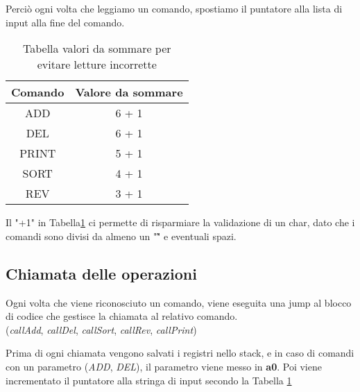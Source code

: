 Perciò ogni volta che leggiamo un comando,
 spostiamo il puntatore alla lista di input alla fine del comando. \\
\begin{table}[H]
\begin{center}
\begin{tabular}{|c|c|}
    \hline
    Comando & Valore da sommare \\
    \hline 
    ADD & 6 + 1 \\
    \hline
    DEL & 6 + 1 \\
    \hline
    PRINT & 5 + 1 \\
    \hline
    SORT & 4 + 1 \\
    \hline
    REV & 3 + 1 \\
    \hline
\end{tabular}
\caption{Tabella valori da sommare per evitare 
letture incorrette}
\label{tab:valoriDaSommare}
\end{center}
\end{table}

Il "+1" in Tabella\ref{tab:valoriDaSommare} ci 
permette di risparmiare la validazione di un char,
 dato che i comandi sono divisi da almeno un "\~" 
 e eventuali spazi.

\subsection{Chiamata delle operazioni}
Ogni volta che viene riconosciuto un comando, viene eseguita una jump al blocco di codice che gestisce la
chiamata al relativo comando.\\
(\textit{callAdd}, \textit{callDel}, \textit{callSort}, \textit{callRev}, \textit{callPrint})

Prima di ogni chiamata vengono salvati i registri nello stack, e in caso di comandi
con un parametro (\textit{ADD}, \textit{DEL}), il parametro viene messo in \textbf{a0}.
Poi viene incrementato il puntatore alla stringa di input secondo la Tabella \ref{tab:valoriDaSommare}
